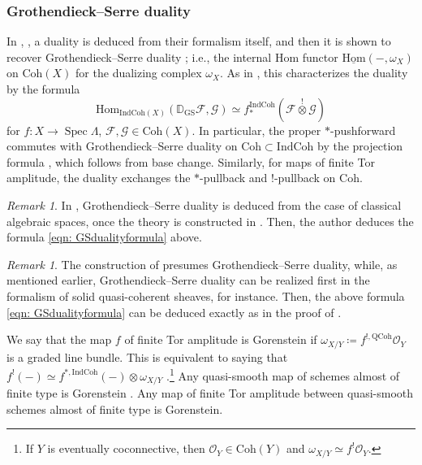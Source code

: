 \documentclass{amsart}
\theoremstyle{definition}
\theoremstyle{remark}
\newtheorem{remark}[theorem]{Remark}
\numberwithin{equation}{section}
\DeclareMathOperator{\Spec}{Spec}
\newcommand{\mc}{\mathcal}
\newcommand{\bb}{\mathbb}
\newcommand{\Hom}{\mathrm{Hom}}
\newcommand{\IndCoh}{\mathrm{IndCoh}}
\newcommand{\QCoh}{\mathrm{QCoh}}
\newcommand{\Coh}{\mathrm{Coh}}
\newcommand{\GS}{\mathrm{GS}}
\begin{document}
\subsubsection{Grothendieck--Serre duality}\label{ss: GSduality}
In \cite[\S 9]{GaitsgoryIndCohSheaves}, \cite[\S 5.4.2]{GRI}, a duality is deduced from their formalism itself, and then it is shown to recover Grothendieck--Serre duality \cite[Proposition 9.5.7]{GaitsgoryIndCohSheaves}; i.e., the internal Hom functor $\underline{\Hom}(-, \omega_X)$ on $\Coh(X)$ for the dualizing complex $\omega_X$. As in \cite[Remark 4.4.5]{DrinfeldGaitsgory}, this characterizes the duality by the formula
\begin{equation}\label{eqn: GSdualityformula}
\Hom_{\IndCoh(X)} (\bb D_{\GS}\mc F, \mc G) \simeq f_*^{\IndCoh}(\mc F \overset{!}{\otimes} \mc G)    
\end{equation}
for $f\colon X\to \Spec \Lambda$, $\mc F, \mc G \in \Coh(X)$. In particular, the proper $*$-pushforward commutes with Grothendieck--Serre duality on $\Coh \subset \IndCoh$ by the projection formula \cite[(3.4)]{DrinfeldGaitsgory}, which follows from base change. Similarly, for maps of finite Tor amplitude, the duality exchanges the $*$-pullback and $!$-pullback on $\Coh$. 

\begin{remark}
In \cite[\S 9.3.4]{ZhuTame}, Grothendieck--Serre duality is deduced from the case of classical algebraic spaces, once the theory is constructed in \cite[Theorem 9.39]{ZhuTame}. Then, the author deduces the formula \eqref{eqn: GSdualityformula} above.      
\end{remark}

\begin{remark}
The construction of \cite[Lecture VIII, Option 5]{ScholzeSixFunctor} presumes Grothendieck--Serre duality, while, as mentioned earlier, Grothendieck--Serre duality can be realized first in the formalism of solid quasi-coherent sheaves, for instance. Then, the above formula \eqref{eqn: GSdualityformula} can be deduced exactly as in the proof of \cite[Theorem 9.42]{ZhuTame}. 
\end{remark}

We say that the map $f$ of finite Tor amplitude is Gorenstein if $\omega_{X/Y}\coloneq f^{!, \QCoh}\mc O_Y$ is a graded line bundle. This is equivalent to saying that $f^{!}(-)\simeq f^{*,\IndCoh} (-)\otimes \omega_{X/Y}$ \cite[Proposition 7.3.8, Proposition 7.4.5]{GaitsgoryIndCohSheaves}.\footnote{If $Y$ is eventually coconnective, then $\mc O_Y\in \Coh(Y)$ and $\omega_{X/Y}\simeq f^! \mc O_Y$.} Any quasi-smooth map of schemes almost of finite type is Gorenstein \cite[Corollary 2.2.7]{ArinkinGaitsgory}. Any map of finite Tor amplitude between quasi-smooth schemes almost of finite type is Gorenstein. 
\end{document}
